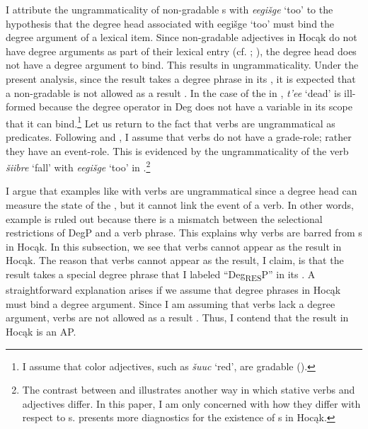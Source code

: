 \documentclass[output=paper]{LSP/langsci}
\begin{document}
I attribute the ungrammaticality of non-gradable s with \textit{eegišge} `too' to the hypothesis that the degree head associated with eegišge `too' must bind the degree argument of a lexical item. Since non-gradable adjectives in Hocąk do not have degree arguments as part of their lexical entry (cf. \citealt{Higginbotham1985}; \citealt{Corver1997}), the degree head does not have a degree argument to bind. This results in ungrammaticality. Under the present analysis, since the result takes a degree phrase in its , it is expected that a non-gradable  is not allowed as a result . In the case of the  in , \textit{t'ee} `dead' is ill-formed because the degree operator in Deg does not have a variable in its scope that it can bind.\footnote{I assume that color adjectives, such as \textit{šuuc} `red', are gradable (\citealt{KennedyMcNally2010}).} Let us return to the fact that verbs are ungrammatical as  predicates. Following \citet{Higginbotham1985} and \citet{Corver1997}, I assume that verbs do not have a grade-role; rather they have an event-role. This is evidenced by the ungrammaticality of the verb \textit{šiibre} `fall' with \textit{eegišge} `too' in .\footnote{The contrast between  and  illustrates another way in which stative verbs and adjectives differ. In this paper, I am only concerned with how they differ with respect to s. \citet{Rosen2014,Rosen2015} presents more diagnostics for the existence of s in Hocąk.}

\begin{exe}


\end{exe}

I argue that  examples like  with verbs are ungrammatical since a degree head can measure the state of the , but it cannot link the event of a verb. In other words, example  is ruled out because there is a mismatch between the selectional restrictions of DegP and a verb phrase. This explains why verbs are barred from s in Hocąk. In this subsection, we see that verbs cannot appear as the result  in Hocąk. The reason that verbs cannot appear as the result, I claim, is that the result  takes a special degree phrase that I labeled ``Deg\textsubscript{RES}P'' in its . A straightforward explanation arises if we assume that degree phrases in Hocąk must bind a degree argument. Since I am assuming that verbs lack a degree argument, verbs are not allowed as a result . Thus, I contend that the result  in Hocąk is an AP.
\end{document}

